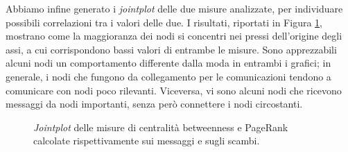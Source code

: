 Abbiamo infine generato i \textit{jointplot} delle due misure analizzate, per individuare possibili correlazioni tra i valori delle due. I risultati, riportati in Figura \ref{fig:joint_centrality}, mostrano come la maggioranza dei nodi si concentri nei pressi dell'origine degli assi, a cui corrispondono bassi valori di entrambe le misure. Sono apprezzabili alcuni nodi un comportamento differente dalla moda in entrambi i grafici; in generale, i nodi che fungono da collegamento per le comunicazioni tendono a comunicare con nodi poco rilevanti. Viceversa, vi sono alcuni nodi che ricevono messaggi da nodi importanti, senza però connettere i nodi circostanti.
\begin{figure}
	\hfill
	\caption{\textit{Jointplot} delle misure di centralità betweenness e PageRank calcolate rispettivamente sui messaggi e sugli scambi.}
	\label{fig:joint_centrality}
\end{figure}

